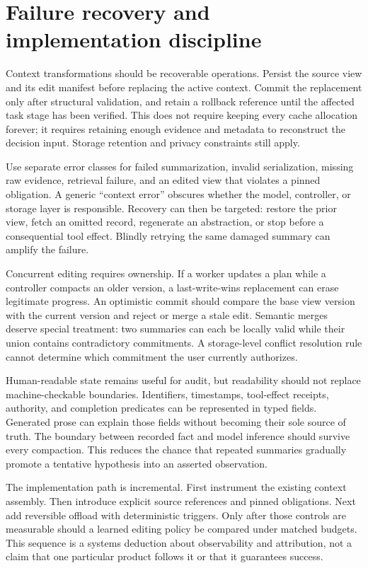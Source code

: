 \section{Failure recovery and implementation discipline}\label{sec:C12:recovery}
Context transformations should be recoverable operations. Persist the source view and its edit manifest before replacing the active context. Commit the replacement only after structural validation, and retain a rollback reference until the affected task stage has been verified. This does not require keeping every cache allocation forever; it requires retaining enough evidence and metadata to reconstruct the decision input. Storage retention and privacy constraints still apply.

Use separate error classes for failed summarization, invalid serialization, missing raw evidence, retrieval failure, and an edited view that violates a pinned obligation. A generic ``context error'' obscures whether the model, controller, or storage layer is responsible. Recovery can then be targeted: restore the prior view, fetch an omitted record, regenerate an abstraction, or stop before a consequential tool effect. Blindly retrying the same damaged summary can amplify the failure.

Concurrent editing requires ownership. If a worker updates a plan while a controller compacts an older version, a last-write-wins replacement can erase legitimate progress. An optimistic commit should compare the base view version with the current version and reject or merge a stale edit. Semantic merges deserve special treatment: two summaries can each be locally valid while their union contains contradictory commitments. A storage-level conflict resolution rule cannot determine which commitment the user currently authorizes.

Human-readable state remains useful for audit, but readability should not replace machine-checkable boundaries. Identifiers, timestamps, tool-effect receipts, authority, and completion predicates can be represented in typed fields. Generated prose can explain those fields without becoming their sole source of truth. The boundary between recorded fact and model inference should survive every compaction. This reduces the chance that repeated summaries gradually promote a tentative hypothesis into an asserted observation.

The implementation path is incremental. First instrument the existing context assembly. Then introduce explicit source references and pinned obligations. Next add reversible offload with deterministic triggers. Only after those controls are measurable should a learned editing policy be compared under matched budgets. This sequence is a systems deduction about observability and attribution, not a claim that one particular product follows it or that it guarantees success.

